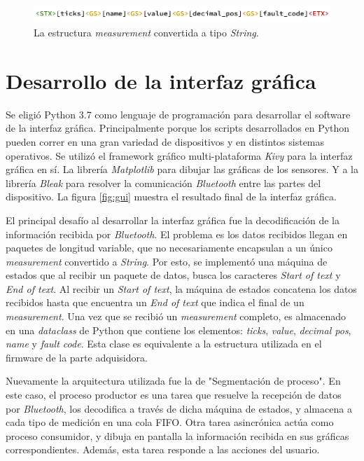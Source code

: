 \begin{figure}[htpb]
\centering
\includegraphics[width=.9\textwidth]{./Figures/measurement-string.png}
\caption{La estructura \textit{measurement} convertida a tipo \textit{String}.}
\label{fig:measurement-string}
\end{figure}


\section{Desarrollo de la interfaz gráfica}

Se eligió Python 3.7 como lenguaje de programación para desarrollar el software de la interfaz gráfica. Principalmente porque los scripts desarrollados en Python pueden correr en una gran variedad de dispositivos y en distintos sistemas operativos. Se utilizó el framework gráfico multi-plataforma \textit{Kivy} para la interfaz gráfica en sí. La librería \textit{Matplotlib} para dibujar las gráficas de los sensores. Y a la librería \textit{Bleak} para resolver la comunicación \textit{Bluetooth} entre las partes del dispositivo. La figura \ref{fig:gui} muestra el resultado final de la interfaz gráfica.

El principal desafío al desarrollar la interfaz gráfica fue la decodificación de la información recibida por \textit{Bluetooth}. El problema es los datos recibidos llegan en paquetes de longitud variable, que no necesariamente encapsulan a un único \textit{measurement} convertido a \textit{String}. Por esto, se implementó una máquina de estados que al recibir un paquete de datos, busca los caracteres \textit{Start of text} y \textit{End of text}. Al recibir un \textit{Start of text}, la máquina de estados concatena los datos recibidos hasta que encuentra un \textit{End of text} que indica el final de un \textit{measurement}. Una vez que se recibió un \textit{measurement} completo, es almacenado en una \textit{dataclass} de Python que contiene los elementos: \textit{ticks}, \textit{value}, \textit{decimal pos}, \textit{name} y \textit{fault code}. Esta clase es equivalente a la estructura utilizada en el firmware de la parte adquisidora.

Nuevamente la arquitectura utilizada fue la de "Segmentación de proceso". En este caso, el proceso productor es una tarea que resuelve la recepción de datos por \textit{Bluetooth}, los decodifica a través de dicha máquina de estados, y almacena a cada tipo de medición en una cola FIFO. Otra tarea asincrónica actúa como proceso consumidor, y dibuja en pantalla la información recibida en sus gráficas correspondientes. Además, esta tarea responde a las acciones del usuario.

